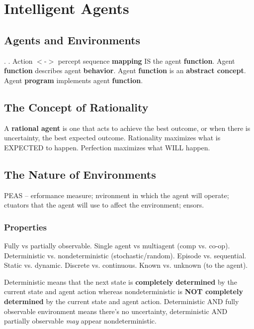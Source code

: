 \documentclass[exam={Midterm},color=true]{cs581exam}
\renewcommand{\emph}[1]{\textbf{#1}}
\begin{document}
\section{Intelligent Agents}\label{sec:intelligent-agents}
\subsection{Agents and Environments}\label{subsec:2.1}
.
.
Action $<$-$>$ percept sequence \emph{mapping} IS the agent \emph{function}.
Agent \emph{function} describes agent \emph{behavior}.
Agent \emph{function} is an \emph{abstract concept}.
Agent \emph{program} implements agent \emph{function}.

\subsection{The Concept of Rationality}\label{subsec:2.2}
A \emph{rational agent} is one that acts to achieve the best outcome, or when there is uncertainty, the best expected outcome.
Rationality maximizes what is EXPECTED to happen.
Perfection maximizes what WILL happen.
%
\subsection{The Nature of Environments}\label{subsec:2.3}
PEAS -- \Peas{}erformance measure;
\pEas{}nvironment in which the agent will operate;
\peAs{}ctuators that the agent will use to affect the environment;
\peaS{}ensors.
\subsubsection{Properties}\label{subsubsec:properties}
Fully vs partially observable.
Single agent vs multiagent (comp vs. co-op).
Deterministic vs. nondeterministic (stochastic/random).
Episode vs. sequential.
Static vs. dynamic.
Discrete vs. continuous.
Known vs. unknown (to the agent).

Deterministic means that the next state is \emph{completely determined} by the current state and agent action
whereas nondeterministic is \emph{NOT completely determined} by the current state and agent action.
Deterministic AND fully observable environment means there's no uncertainty, deterministic AND partially observable \textit{may} appear nondeterministic.
\end{document}
